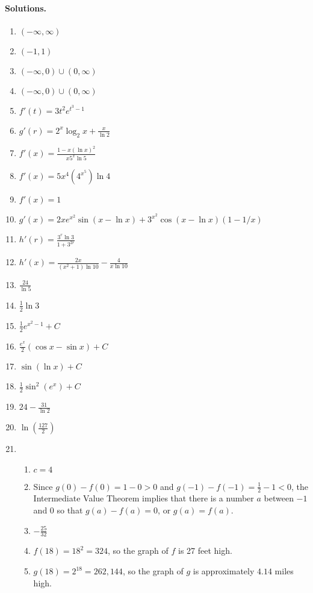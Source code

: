 \paragraph{Solutions.}
\begin{enumerate}
\item $(-\infty,\infty)$
\item $(-1,1)$
\item $(-\infty,0)\cup(0,\infty)$
\item $(-\infty,0)\cup(0,\infty)$

\item $f'(t)=3t^2e^{t^3-1}$
\item $\displaystyle g'(r)=2^x\log_2 x+\frac x{\ln 2}$
\item $\displaystyle f'(x)=\frac{1-x(\ln x)^2}{x5^x\ln 5}$
\item $f'(x)=5x^4(4^{x^5})\ln 4$
\item $f'(x)=1$
\item $g'(x)=2xe^{x^2}\sin(x-\ln x)+3^{x^2}\cos(x-\ln x)(1-1/x)$
\item $\displaystyle h'(r)=\frac{3^r\ln 3}{1+3^{2r}}$
\item $\displaystyle h'(x)=\frac{2x}{(x^2+1)\ln 10}-\frac{4}{x\ln 10}$

\item $\displaystyle \frac{24}{\ln 5}$
\item $\frac12\ln 3$
\item $\frac12e^{x^2-1}+C$
\item $\displaystyle \frac{e^x}2(\cos x-\sin x)+C$
\item $\sin(\ln x)+C$
\item $\frac12 \sin^2(e^x)+C$
\item $\displaystyle 24-\frac{31}{\ln 2}$
\item $\displaystyle \ln\left(\frac{127}2\right)$
\item \begin{enumerate}
\item $c=4$
\item Since $g(0)-f(0)=1-0>0$ and $g(-1)-f(-1)=\frac12-1<0$, the Intermediate Value Theorem implies that there is a number $a$ between $-1$ and $0$ so that $g(a)-f(a)=0$, or $g(a)=f(a)$.
\item $-\frac{25}{32}$
\item $f(18)=18^2=324$, so the graph of $f$ is 27 feet high.
\item[] $g(18)=2^{18}=262,144$, so the graph of $g$ is approximately $4.14$ miles high. 
\end{enumerate}
\end{enumerate}
